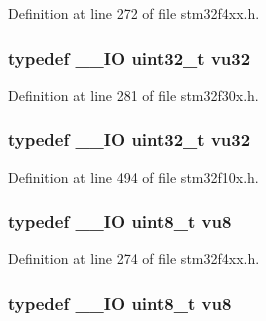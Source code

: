 Definition at line 272 of file stm32f4xx.\-h.

\hypertarget{group___exported__types_ga0cd21c4793673b69ecd5fd673353a145}{
\subsubsection[{vu32}]{\setlength{\rightskip}{0pt plus 5cm}typedef \-\_\-\-\_\-\-I\-O {\bf uint32\-\_\-t} {\bf vu32}}}\label{group___exported__types_ga0cd21c4793673b69ecd5fd673353a145}


Definition at line 281 of file stm32f30x.\-h.

\hypertarget{group___exported__types_ga0cd21c4793673b69ecd5fd673353a145}{
\subsubsection[{vu32}]{\setlength{\rightskip}{0pt plus 5cm}typedef \-\_\-\-\_\-\-I\-O {\bf uint32\-\_\-t} {\bf vu32}}}\label{group___exported__types_ga0cd21c4793673b69ecd5fd673353a145}


Definition at line 494 of file stm32f10x.\-h.

\hypertarget{group___exported__types_ga4a8fa9a2b4796540a6d65a04eb18e111}{
\subsubsection[{vu8}]{\setlength{\rightskip}{0pt plus 5cm}typedef \-\_\-\-\_\-\-I\-O {\bf uint8\-\_\-t} {\bf vu8}}}\label{group___exported__types_ga4a8fa9a2b4796540a6d65a04eb18e111}


Definition at line 274 of file stm32f4xx.\-h.

\hypertarget{group___exported__types_ga4a8fa9a2b4796540a6d65a04eb18e111}{
\subsubsection[{vu8}]{\setlength{\rightskip}{0pt plus 5cm}typedef \-\_\-\-\_\-\-I\-O {\bf uint8\-\_\-t} {\bf vu8}}}\label{group___exported__types_ga4a8fa9a2b4796540a6d65a04eb18e111}


